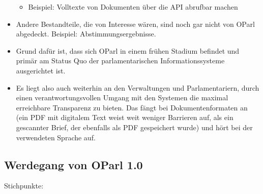 \documentclass[,a4paper]{article}
\begin{document}
\begin{itemize}
  \begin{itemize}
  \item
    Beispiel: Volltexte von Dokumenten über die API abrufbar machen
  \end{itemize}
\item
  Andere Bestandteile, die von Interesse wären, sind noch gar nicht von
  OParl abgedeckt. Beispiel: Abstimmungsergebnisse.
\item
  Grund dafür ist, dass sich OParl in einem frühen Stadium befindet und
  primär am Status Quo der parlamentarischen Informationssysteme
  ausgerichtet ist.
\item
  Es liegt also auch weiterhin an den Verwaltungen und Parlamentariern,
  durch einen verantwortungsvollen Umgang mit den Systemen die maximal
  erreichbare Transparenz zu bieten. Das fängt bei Dokumentenformaten an
  (ein PDF mit digitalem Text weist weit weniger Barrieren auf, als ein
  gescannter Brief, der ebenfalls als PDF gespeichert wurde) und hört
  bei der verwendeten Sprache auf.
\end{itemize}

\subsection{Werdegang von OParl 1.0}

Stichpunkte:
\end{document}
